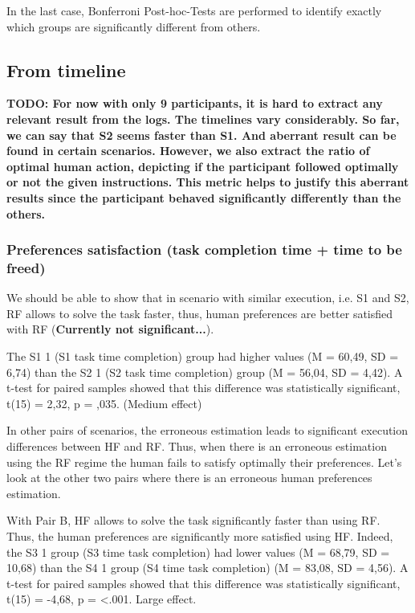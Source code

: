 In the last case, Bonferroni Post-hoc-Tests are performed to identify exactly which groups are significantly different from others.



\subsection{From timeline}
\textbf{TODO: For now with only 9 participants, it is hard to extract any relevant result from the logs. The timelines vary considerably. So far, we can say that S2 seems faster than S1. And aberrant result can be found in certain scenarios. However, we also extract the ratio of optimal human action, depicting if the participant followed optimally or not the given instructions. This metric helps to justify this aberrant results since the participant behaved significantly differently than the others.}

\subsubsection*{Preferences satisfaction (task completion time + time to be freed)}
We should be able to show that in scenario with similar execution, i.e. S1 and S2, RF allows to solve the task faster, thus, human preferences are better satisfied with RF (\textbf{Currently not significant...}).

The S1 1 (S1 task time completion) group had higher values (M = 60,49, SD = 6,74) than the S2 1 (S2 task time completion) group (M = 56,04, SD = 4,42). A t-test for paired samples showed that this difference was statistically significant, t(15) = 2,32, p = ,035. (Medium effect)

In other pairs of scenarios, the erroneous estimation leads to significant execution differences between HF and RF. Thus, when there is an erroneous estimation using the RF regime the human fails to satisfy optimally their preferences. Let's look at the other two pairs where there is an erroneous human preferences estimation. 

With Pair B, HF allows to solve the task significantly faster than using RF. Thus, the human preferences are significantly more satisfied using HF.   
Indeed, the S3 1 group (S3 time task completion) had lower values (M = 68,79, SD = 10,68) than the S4 1 group (S4 time task completion) (M = 83,08, SD = 4,56). A t-test for paired samples showed that this difference was statistically significant, t(15) = -4,68, p = <.001. Large effect.

